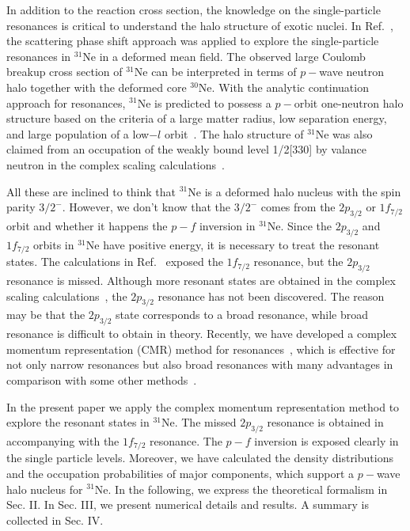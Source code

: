 \documentclass[twocolumn,prc,showpacs,preprintnumbers,superscriptaddress,floatfix]{revtex4}
\begin{document}
In addition to the reaction cross section, the knowledge on the
single-particle resonances is critical to understand the halo structure of
exotic nuclei. In Ref.~\cite{Hamamoto2010}, the scattering phase shift
approach was applied to explore the single-particle resonances in $^{31}$Ne
in a deformed mean field. The observed large Coulomb breakup cross section
of $^{31}$Ne can be interpreted in terms of $p-$wave neutron halo together
with the deformed core $^{30}$Ne. With the analytic continuation approach
for resonances, $^{31}$Ne is predicted to possess a $p-$orbit one-neutron
halo structure based on the criteria of a large matter radius, low
separation energy, and large population of a low$-l$ orbit~\cite{Zhang2014}.
The halo structure of $^{31}$Ne was also claimed from an occupation of the
weakly bound level 1/2[330] by valance neutron in the complex scaling
calculations~\cite{Liu2012}.

All these are inclined to think that $^{31}$Ne is a deformed halo nucleus
with the spin parity $3/2^{-}$. However, we don't know that the $3/2^{-}$
comes from the $2p_{3/2}$ or $1f_{7/2}$ orbit and whether it happens the $%
p-f $ inversion in $^{31}$Ne. Since the $2p_{3/2}$ and $1f_{7/2}$ orbits in $%
^{31}$Ne have positive energy, it is necessary to treat the resonant states.
The calculations in Ref.~\cite{Hamamoto2010} exposed the $1f_{7/2}$
resonance, but the $2p_{3/2}$ resonance is missed. Although more resonant
states are obtained in the complex scaling calculations~\cite{Liu2012}, the $%
2p_{3/2}$ resonance has not been discovered. The reason may be that the $%
2p_{3/2}$ state corresponds to a broad resonance, while broad resonance is
difficult to obtain in theory. Recently, we have developed a complex
momentum representation (CMR) method for resonances~\cite{li2016,Fang2017},
which is effective for not only narrow resonances but also broad resonances
with many advantages in comparison with some other methods~\cite%
{li2016,Tian2017}.

In the present paper we apply the complex momentum representation method to
explore the resonant states in $^{31}$Ne. The missed $2p_{3/2}$ resonance is
obtained in accompanying with the $1f_{7/2}$ resonance. The $p-f$ inversion
is exposed clearly in the single particle levels. Moreover, we have
calculated the density distributions and the occupation probabilities of
major components, which support a $p-$wave halo nucleus for $^{31}$Ne. In
the following, we express the theoretical formalism in Sec. II. In Sec. III,
we present numerical details and results. A summary is collected in Sec. IV.
\end{document}
